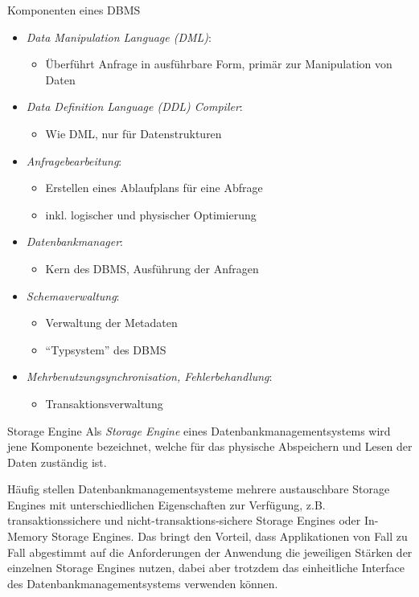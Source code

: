 \begin{defi}{Komponenten eines DBMS}
    \begin{itemize}
        \item \emph{Data Manipulation Language (DML)}:
              \begin{itemize}
                  \item Überführt Anfrage in ausführbare Form, primär zur Manipulation von Daten
              \end{itemize}
        \item \emph{Data Definition Language (DDL) Compiler}:
              \begin{itemize}
                  \item Wie DML, nur für Datenstrukturen
              \end{itemize}
        \item \emph{Anfragebearbeitung}:
              \begin{itemize}
                  \item Erstellen eines Ablaufplans für eine Abfrage
                  \item inkl. logischer und physischer Optimierung
              \end{itemize}
        \item \emph{Datenbankmanager}:
              \begin{itemize}
                  \item Kern des DBMS, Ausführung der Anfragen
              \end{itemize}
        \item \emph{Schemaverwaltung}:
              \begin{itemize}
                  \item Verwaltung der Metadaten
                  \item \enquote{Typsystem} des DBMS
              \end{itemize}
        \item \emph{Mehrbenutzungsynchronisation, Fehlerbehandlung}:
              \begin{itemize}
                  \item Transaktionsverwaltung
              \end{itemize}
    \end{itemize}
\end{defi}

\begin{defi}{Storage Engine}
    Als \emph{Storage Engine} eines Datenbankmanagementsystems wird jene Komponente bezeichnet, welche für das physische Abspeichern und Lesen der Daten zuständig ist.

    Häufig stellen Datenbankmanagementsysteme mehrere austauschbare Storage Engines mit unterschiedlichen Eigenschaften zur Verfügung, z.B. transaktionssichere und nicht-transaktions-sichere Storage Engines oder In-Memory Storage Engines. Das bringt den Vorteil, dass Applikationen von Fall zu Fall abgestimmt auf die Anforderungen der Anwendung die jeweiligen Stärken der einzelnen Storage Engines nutzen, dabei aber trotzdem das einheitliche Interface des Datenbankmanagementsystems verwenden können.
\end{defi}

